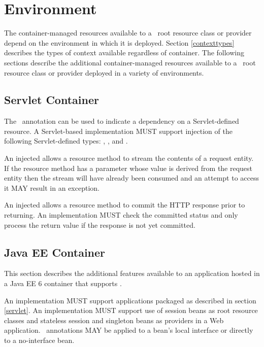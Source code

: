 \chapter{Environment}
\label{environment}

The container-managed resources available to a \jaxrs\ root resource class or provider depend on the environment in which it is deployed. Section \ref{contexttypes} describes the types of context available regardless of container. The following sections describe the additional container-managed resources available to a \jaxrs\ root resource class or provider deployed in a variety of environments.

\section{Servlet Container}

The \Context\ annotation can be used to indicate a dependency on a Servlet-defined resource. A Servlet-based implementation MUST support injection of the following Servlet-defined types: , ,  and .

An injected  allows a resource method to stream the contents of a request entity. If the resource method has a parameter whose value is derived from the request entity then the stream will have already been consumed and an attempt to access it MAY result in an exception.

An injected  allows a resource method to commit the HTTP response prior to returning. An implementation MUST check the committed status and only process the return value if the response is not yet committed.

\section{Java EE Container}
\label{javaee}

This section describes the additional features available to an application hosted in a Java EE 6 container that supports \jaxrs.

An implementation MUST support applications packaged as described in section \ref{servlet}. An implementation MUST support use of session beans as root resource classes and stateless session and singleton beans as providers in a Web application. \jaxrs\ annotations MAY be applied to a bean's local interface or directly to a no-interface bean.

